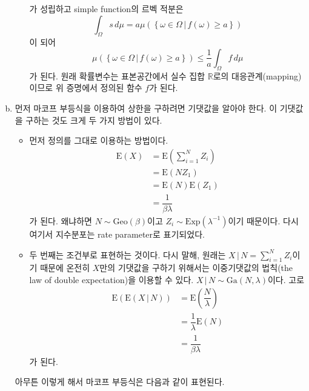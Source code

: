 \documentclass[answers]{exam}
\begin{document}
\begin{questions}
\begin{solution}
\begin{enumerate}[(a)]
\begin{itemize}
          가 성립하고 simple function의 르벡 적분은
          \begin{equation}
            \int_{\Omega}s\,d\mu = a\mu\left(\left\{\omega \in \Omega\,|\, f\left(\omega\right)\geq a\right\}\right)
          \end{equation}
          이 되어
          \begin{equation}
            \mu\left(\left\{\omega \in \Omega\,|\, f\left(\omega\right)\geq a\right\}\right) \leq \dfrac{1}{a}\int_{\Omega}f\,d\mu
          \end{equation}
          가 된다. 원래 확률변수는 표본공간에서 실수 집합 $\mathbb{R}$로의 대응관계(mapping)이므로 위 증명에서 정의된 함수 $f$가 된다.
        \end{itemize}
        \item 먼저 마코프 부등식을 이용하여 상한을 구하려면 기댓값을 알아야 한다. 이 기댓값을 구하는 것도 크게 두 가지 방법이 있다.
        \begin{itemize}
          \item 먼저 정의를 그대로 이용하는 방법이다.
          \begin{align}
            \mathrm{E}\left(X\right) &= \mathrm{E}\left(\sum_{i=1}^{N}Z_{i}\right)\\
            &= \mathrm{E}\left(NZ_{1}\right)\\
            &=\mathrm{E}\left(N\right)\mathrm{E}\left(Z_{1}\right)\\
            &= \dfrac{1}{\beta\lambda}
          \end{align}
          가 된다. 왜냐하면 $N\sim \mathrm{Geo}\left(\beta\right)$이고 $Z_{i}\sim \mathrm{Exp}\left(\lambda^{-1}\right)$이기 때문이다. 다시 여기서 지수분포는 rate parameter로 표기되었다. 
          \item 두 번째는 조건부로 표현하는 것이다. 다시 말해, 원래는 $X\,|\,N=\sum_{i=1}^{N}Z_{i}$이기 때문에 온전히 $X$만의 기댓값을 구하기 위해서는 이중기댓값의 법칙(the law of double expectation)을 이용할 수 있다. $X\,|\,N \sim \mathrm{Ga}\left(N,\lambda\right)$이다. 고로
          \begin{align}
            \mathrm{E}\left(\mathrm{E}\left(X\,|\,N\right)\right) &= \mathrm{E}\left(\dfrac{N}{\lambda}\right)\\
            &= \dfrac{1}{\lambda}\mathrm{E}\left(N\right)\\
            &= \dfrac{1}{\beta\lambda}
          \end{align}
          가 된다.
        \end{itemize}
        아무튼 이렇게 해서 마코프 부등식은 다음과 같이 표현된다.

\end{enumerate}
\end{solution}
\end{questions}
\end{document}
